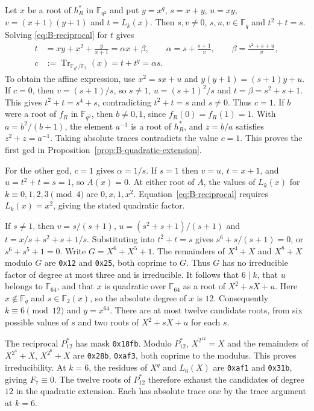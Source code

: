 \documentclass[11pt]{article}
\theoremstyle{definition}
\theoremstyle{remark}
\begin{document}
Let $x$ be a root of $h_R^*$ in $\mathbb F_{q^2}$ and put
$y=x^q$, $s=x+y$, $u=xy$, $v=(x+1)(y+1)$ and $t=L_k(x)$.
Then $s,v\ne0$, $s,u,v\in\mathbb F_q$ and $t^2+t=s$.
Solving \eqref{eq:B-reciprocal} for $t$ gives
\begin{align*}
 t &= xy+x^2+\frac{y}{x+1}=\alpha x+\beta,\qquad
 \alpha=s+\frac{s+1}{v},\qquad
 \beta=\frac{s^2+s+u}{v},\\
 c &:=\operatorname{Tr}_{\mathbb F_{q^2}/\mathbb F_2}(x)
       =t+t^q=\alpha s .
\end{align*}
To obtain the affine expression, use
$x^2=sx+u$ and $y(y+1)=(s+1)y+u$.
If $c=0$, then $v=(s+1)/s$, so $s\ne1$,
$u=(s+1)^2/s$ and $t=\beta=s^2+s+1$.
This gives $t^2+t=s^4+s$, contradicting $t^2+t=s$ and $s\ne0$.
Thus $c=1$. If $b$ were a root of $f_R$ in $\mathbb F_{q^2}$,
then $b\ne0,1$, since $f_R(0)=f_R(1)=1$. With
$a=b^2/(b+1)$, the element $a^{-1}$ is a root of $h_R^*$, and
$z=b/a$ satisfies $z^2+z=a^{-1}$. Taking absolute traces
contradicts the value $c=1$. This proves the first gcd in
Proposition~\ref{prop:B-quadratic-extension}.

For the other gcd, $c=1$ gives $\alpha=1/s$. If $s=1$ then
$v=u$, $t=x+1$, and $u=t^2+t=s=1$, so $A(x)=0$.
At either root of $A$, the values of $L_k(x)$ for $k\equiv0,1,2,3\pmod4$
are $0,x,1,x^2$. Equation~\eqref{eq:B-reciprocal} requires
$L_k(x)=x^2$, giving the stated quadratic factor.

If $s\ne1$, then $v=s/(s+1)$, $u=(s^2+s+1)/(s+1)$ and
$t=x/s+s^2+s+1/s$. Substituting into $t^2+t=s$ gives
$s^6+s/(s+1)=0$, or $s^6+s^5+1=0$. Write $G=X^6+X^5+1$.
The remainders of $X^4+X$ and $X^8+X$ modulo $G$ are
\texttt{0x12} and \texttt{0x25}, both coprime to $G$.
Thus $G$ has no irreducible factor of degree at most three and
is irreducible. It follows that $6\mid k$, that $u$ belongs to
$\mathbb F_{64}$, and that $x$ is quadratic over $\mathbb F_{64}$
as a root of $X^2+sX+u$. Here $x\notin\mathbb F_q$ and
$s\in\mathbb F_2(x)$, so the absolute degree of $x$ is $12$.
Consequently $k\equiv6\pmod{12}$ and $y=x^{64}$.
There are at most twelve candidate roots, from six possible values
of $s$ and two roots of $X^2+sX+u$ for each $s$.

The reciprocal $P_{12}^*$ has mask \texttt{0x18fb}. Modulo
$P_{12}^*$, $X^{2^{12}}=X$ and the remainders of
$X^{2^4}+X$, $X^{2^6}+X$ are \texttt{0x28b}, \texttt{0xaf3},
both coprime to the modulus. This proves irreducibility.
At $k=6$, the residues of $X^q$ and $L_6(X)$ are
\texttt{0xaf1} and \texttt{0x31b}, giving $F_7\equiv0$.
The twelve roots of $P_{12}^*$ therefore exhaust the candidates
of degree $12$ in the quadratic extension. Each has absolute
trace one by the trace argument at $k=6$.
\end{document}
